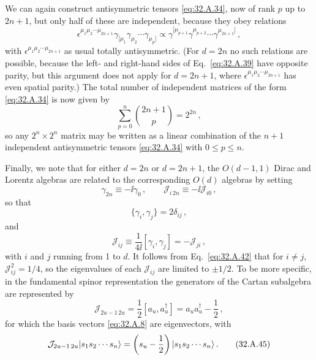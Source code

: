 We can again construct antisymmetric tensors \eqref{eq:32.A.34}, now of rank
\(p\) up to \(2n+1\), but only half of these are independent, because they
obey relations
\begin{equation}
  \epsilon^{\mu_1\mu_2\cdots\mu_{2n+1}}
  \gamma_{[\mu_1}\gamma_{\mu_2}\cdots\gamma_{\mu_p]}
  \propto
  \gamma^{[\mu_{p+1}}\gamma^{\mu_{p+2}}\cdots\gamma^{\mu_{2n+1}]}\,,
  \tag{32.A.39}\label{eq:32.A.39}
\end{equation}
with \(\epsilon^{\mu_1\mu_2\cdots\mu_{2n+1}}\) as usual totally
antisymmetric. (For \(d=2n\) no such relations are possible, because the
left- and right-hand sides of Eq.~\eqref{eq:32.A.39} have opposite parity,
but this argument does not apply for \(d=2n+1\), where
\(\epsilon^{\mu_1\mu_2\cdots\mu_{2n+1}}\) has even spatial parity.) The
total number of independent matrices of the form \eqref{eq:32.A.34} is now
given by
\begin{equation}
  \sum_{p=0}^{n}\binom{2n+1}{p}=2^{2n}\,,
  \tag{32.A.40}\label{eq:32.A.40}
\end{equation}
so any \(2^n\times2^n\) matrix may be written as a linear combination of the
\(n+1\) independent antisymmetric tensors \eqref{eq:32.A.34} with
\(0\le p\le n\).

Finally, we note that for either \(d=2n\) or \(d=2n+1\), the \(O(d-1,1)\)
Dirac and Lorentz algebras are related to the corresponding \(O(d)\)
algebras by setting
\begin{equation}
  \gamma_{2n}\equiv-\ii\gamma_0\,,
  \qquad
  \mathcal J_{i\,2n}\equiv-\ii\mathcal J_{i0}\,,
  \tag{32.A.41}\label{eq:32.A.41}
\end{equation}
so that
\begin{equation}
  \{\gamma_i,\gamma_j\}=2\delta_{ij}\,,
  \tag{32.A.42}\label{eq:32.A.42}
\end{equation}
and
\begin{equation}
  \mathcal J_{ij}
  \equiv\frac{1}{4\ii}[\gamma_i,\gamma_j]
  =-\mathcal J_{ji}\,,
  \tag{32.A.43}\label{eq:32.A.43}
\end{equation}
with \(i\) and \(j\) running from 1 to \(d\). It follows from
Eq.~\eqref{eq:32.A.42} that for \(i\ne j\),
\(\mathcal J_{ij}^2=1/4\), so the eigenvalues of each \(\mathcal J_{ij}\)
are limited to \(\pm1/2\). To be more specific, in the fundamental spinor
representation the generators of the Cartan subalgebra are represented by
\begin{equation}
  \mathcal J_{2u-1\,2u}
  =\frac{1}{2}[a_u,a_u^\dagger]
  =a_ua_u^\dagger-\frac{1}{2}\,,
  \tag{32.A.44}\label{eq:32.A.44}
\end{equation}
for which the basis vectors \eqref{eq:32.A.8} are eigenvectors, with
\begin{equation}
  \mathcal J_{2u-1\,2u}\lvert s_1s_2\cdots s_n\rangle
  =\left(s_u-\frac{1}{2}\right)\lvert s_1s_2\cdots s_n\rangle\,.
  \tag{32.A.45}\label{eq:32.A.45}
\end{equation}


